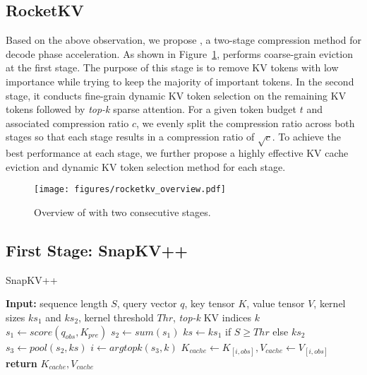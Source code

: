 \subsection{RocketKV}
Based on the above observation, we propose \rocketkv, a two-stage \kv compression method for decode phase acceleration. As shown in Figure~\ref{fig:rocketkv}, \rocketkv performs coarse-grain \kv eviction at the first stage. The purpose of this stage is to remove KV tokens with low importance while trying to keep the majority of important tokens. In the second stage, it conducts fine-grain dynamic KV token selection on the remaining KV tokens followed by \textit{top-k} sparse attention. For a given token budget $t$ and associated compression ratio $c$, we evenly split the compression ratio across both stages so that each stage results in a compression ratio of $\sqrt{c}$. To achieve the best performance at each stage, we further propose a highly effective KV cache eviction and dynamic KV token selection method for each stage.


\begin{figure}[t]
  \centering
  \texttt{[image: figures/rocketkv\_overview.pdf]}
  \caption{Overview of \rocketkv with two consecutive stages.
 }
  \label{fig:rocketkv}
\end{figure}



\subsection{First Stage: SnapKV++} 


\begin{algorithm}[t]
\caption{SnapKV++} 
\label{alg:snapkv++}
\begin{algorithmic}
\STATE \textbf{Input:}
{sequence length $S$, query vector $q$, key tensor $K$, value tensor $V$, kernel sizes $ks_1$ and $ks_2$, kernel threshold $Thr$, \textit{top-k} KV indices $k$}
\STATE $s_1 \gets score(q_{obs}, K_{pre})$
\STATE $s_2 \gets sum(s_1)$
\STATE $ks \gets ks_1$ if $S \geq Thr$ else $ks_2$
\STATE $s_3 \gets pool(s_2, ks)$
\STATE $i \gets argtopk(s_3, k)$
\STATE $K_{cache} \gets K_{[i,obs]}, V_{cache} \gets V_{[i,obs]}$
\STATE \textbf{return}  $K_{cache}, V_{cache}$
\end{algorithmic}
\end{algorithm}


